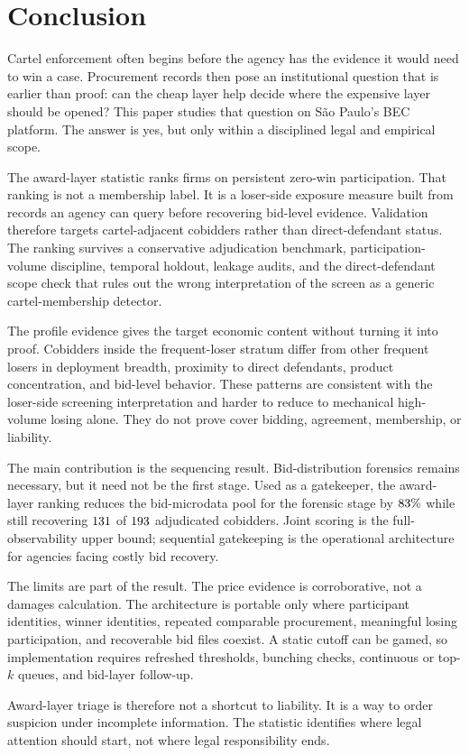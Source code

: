 \section{Conclusion}
\label{sec:conclusion_v18}

Cartel enforcement often begins before the agency has the
evidence it would need to win a case. Procurement records then
pose an institutional question that is earlier than proof: can
the cheap layer help decide where the expensive layer should be
opened? This paper studies that question on São Paulo's BEC
platform. The answer is yes, but only within a disciplined
legal and empirical scope.

The award-layer statistic ranks firms on persistent zero-win
participation. That ranking is not a membership label. It is a
loser-side exposure measure built from records an agency can
query before recovering bid-level evidence. Validation
therefore targets cartel-adjacent cobidders rather than
direct-defendant status. The ranking survives a conservative
adjudication benchmark, participation-volume discipline,
temporal holdout, leakage audits, and the direct-defendant
scope check that rules out the wrong interpretation of the
screen as a generic cartel-membership detector.

The profile evidence gives the target economic content without
turning it into proof. Cobidders inside the frequent-loser
stratum differ from other frequent losers in deployment
breadth, proximity to direct defendants, product concentration,
and bid-level behavior. These patterns are consistent with the
loser-side screening interpretation and harder to reduce to
mechanical high-volume losing alone. They do not prove cover
bidding, agreement, membership, or liability.

The main contribution is the sequencing result. Bid-distribution
forensics remains necessary, but it need not be the first
stage. Used as a gatekeeper, the award-layer ranking reduces
the bid-microdata pool for the forensic stage by
$83\%$ while still recovering
$131$ of $193$ adjudicated cobidders.
Joint scoring is the full-observability upper bound; sequential
gatekeeping is the operational architecture for agencies facing
costly bid recovery.

The limits are part of the result. The price evidence is
corroborative, not a damages calculation. The architecture is
portable only where participant identities, winner identities,
repeated comparable procurement, meaningful losing
participation, and recoverable bid files coexist. A static
cutoff can be gamed, so implementation requires refreshed
thresholds, bunching checks, continuous or top-$k$ queues, and
bid-layer follow-up.

Award-layer triage is therefore not a shortcut to liability. It
is a way to order suspicion under incomplete information. The
statistic identifies where legal attention should start, not
where legal responsibility ends.
